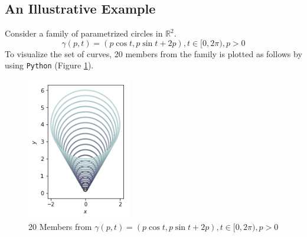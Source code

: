 \documentclass[a4paper]{article}
\begin{document}
\subsection{An Illustrative Example}
Consider a family of parametrized circles in $\mathbb{R}^2$.
$$\gamma(p,t) = (p \cos t, p\sin t + 2p), t \in [0,2\pi), p>0$$
To visualize the set of curves, 20 members from the family is plotted as follows by using \texttt{Python} (Figure \ref{fig:family}).

\begin{figure}[!htbp]
	\centering
	\includegraphics[width=0.4\textwidth]{family_20.png}
	\caption{20 Members from $\gamma(p,t) = (p \cos t, p\sin t + 2p), t \in [0,2\pi), p>0$}
	\label{fig:family}
\end{figure}
\end{document}
